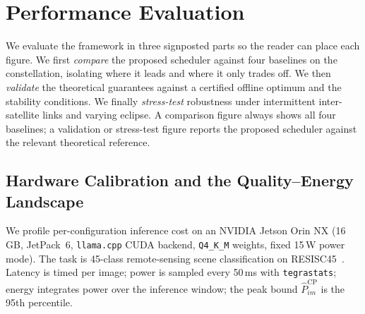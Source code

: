 \section{Performance Evaluation}\label{EVAL}
We evaluate the framework in three signposted parts so the reader can place each
figure. We first \emph{compare} the proposed scheduler against four baselines on the
constellation, isolating where it leads and where it only trades off. We then
\emph{validate} the theoretical guarantees against a certified offline optimum and the
stability conditions. We finally \emph{stress-test} robustness under intermittent
inter-satellite links and varying eclipse. A comparison figure always shows all four
baselines; a validation or stress-test figure reports the proposed scheduler against the
relevant theoretical reference.

\subsection{Hardware Calibration and the Quality--Energy Landscape}\label{EV_CALIB}
We profile per-configuration inference cost on an NVIDIA Jetson Orin NX (16\,GB, JetPack~6,
\texttt{llama.cpp} CUDA backend, \texttt{Q4\_K\_M} weights, fixed 15\,W power mode). The task is
45-class remote-sensing scene classification on RESISC45~\cite{Cheng2017RESISC45}. Latency is
timed per image; power is sampled every 50\,ms with \texttt{tegrastats}; energy integrates power
over the inference window; the peak bound $\hat{P}_{im}^{\text{CP}}$ is the 95th percentile.

